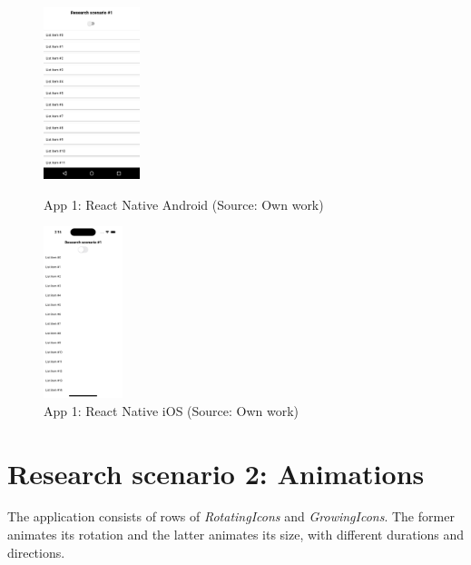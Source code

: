 \begin{figure}[H]
  \begin{minipage}{.47\textwidth}
    \centering
    \includegraphics[height=50mm]{img/app1_rn_android}
    \caption{App 1: React Native Android (Source: Own work)}
    \label{fig:app1_rn_android}
  \end{minipage}
  \hfill
  \begin{minipage}{.47\textwidth}
    \centering
    \includegraphics[height=50mm]{img/app1_rn_ios}
    \caption{App 1: React Native iOS (Source: Own work)}
    \label{fig:app1_rn_ios}
  \end{minipage}
\end{figure}

\section{Research scenario 2: Animations}

The application consists of rows of \emph{RotatingIcons} and \emph{GrowingIcons}. The former animates its rotation and the latter animates its size, with different durations and directions.


